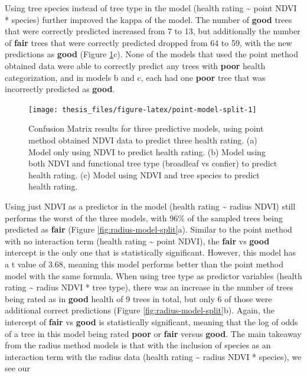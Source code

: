 \documentclass[12pt,twoside]{reedthesis}
\begin{document}
Using tree species instead of tree type in the model (health rating \textasciitilde{}
point NDVI * species) further improved the kappa of the model. The
number of \textbf{good} trees that were correctly predicted increased from 7
to 13, but additionally the number of \textbf{fair} trees that were correctly
predicted dropped from 64 to 59, with the new predictions as \textbf{good}
(Figure \ref{fig:point-model-split}c). None of the models that used the
point method obtained data were able to correctly predict any trees with
\textbf{poor} health categorization, and in models b and c, each had one
\textbf{poor} tree that was incorrectly predicted as \textbf{good}.
\begin{figure}

{\centering \texttt{[image: thesis\_files/figure-latex/point-model-split-1]} 

}

\caption[Confusion matrixes for Point method predictive models]{Confusion Matrix results for three predictive models, using point method obtained NDVI data to predict three health rating. (a) Model only using NDVI to predict health rating. (b) Model using both NDVI and functional tree type (broadleaf vs confier) to predict health rating. (c) Model using NDVI and tree species to predict health rating.}\label{fig:point-model-split}
\end{figure}
Using just NDVI as a predictor in the model (health rating \textasciitilde{} radius
NDVI) still performs the worst of the three models, with 96\% of the
sampled trees being predicted as \textbf{fair} (Figure
\ref{fig:radius-model-split}a). Similar to the point method with no
interaction term (health rating \textasciitilde{} point NDVI), the \textbf{fair} vs \textbf{good}
intercept is the only one that is statistically significant. However,
this model has a t value of 3.68, meaning this model performs better
than the point method model with the same formula. When using tree type
as predictor variables (health rating \textasciitilde{} radius NDVI * tree type),
there was an increase in the number of trees being rated as in \textbf{good}
health of 9 trees in total, but only 6 of those were additional correct
predictions (Figure \ref{fig:radius-model-split}b). Again, the
intercept of \textbf{fair} vs \textbf{good} is statistically significant, meaning
that the log of odds of a tree in this model being rated \textbf{poor} or
\textbf{fair} versus \textbf{good}. The main takeaway from the radius method
models is that with the inclusion of species as an interaction term with
the radius data (health rating \textasciitilde{} radius NDVI * species), we see our
\end{document}
